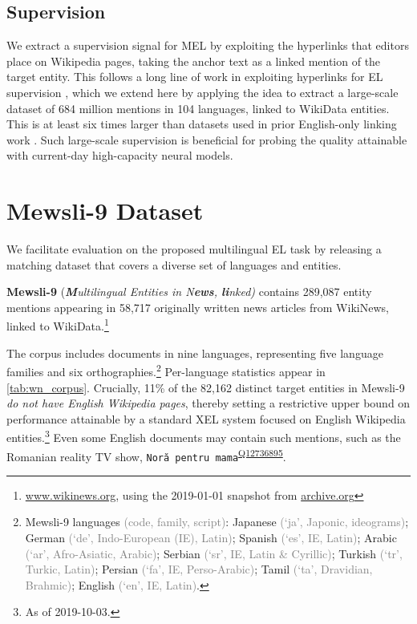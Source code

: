 \documentclass[11pt,a4paper]{article}
\newcommand{\entity}[1]{\texttt{#1}}
\newcommand{\ientity}[2]{\entity{#1}\textsuperscript{\href{https://www.wikidata.org/wiki/#2}{#2}}}
\begin{document}
\subsection{Supervision}
We extract a supervision signal for MEL by exploiting the hyperlinks that editors place on Wikipedia pages, taking the anchor text as a linked mention of the target entity.
This follows a long line of work in exploiting hyperlinks for EL supervision \cite{bunescu-pasca-2006-using,singh12:wiki-links,logan-etal-2019-baracks},
which we extend here by applying the idea to extract a large-scale dataset of 684 million mentions in 104 languages, linked to WikiData entities.
This is at least six times larger than datasets used in prior English-only linking work \citep{gillick-etal-2019-learning}.
Such large-scale supervision is beneficial for probing the quality attainable with current-day high-capacity neural models.

\section{Mewsli-9 Dataset}
We facilitate evaluation on the proposed multilingual EL task by releasing a matching dataset that covers a diverse set of languages and entities.

\textbf{Mewsli-9} (\emph{\textbf{M}ultilingual Entities in N\textbf{ews}, \textbf{li}nked)} contains 289,087 entity mentions appearing in 58,717 originally written news articles from WikiNews,
linked to WikiData.\footnote{\url{www.wikinews.org}, using the 2019-01-01 snapshot from \url{archive.org}}

The corpus includes documents in nine languages, representing five language families and six orthographies.\footnote{Mewsli-9 languages \textcolor{gray}{(code, family, script)}:
Japanese \textcolor{gray}{(`ja', Japonic, ideograms)};
German   \textcolor{gray}{(`de', Indo-European (IE), Latin)};
Spanish  \textcolor{gray}{(`es', IE, Latin)};
Arabic   \textcolor{gray}{(`ar', Afro-Asiatic,} \textcolor{gray}{Arabic)};
Serbian  \textcolor{gray}{(`sr', IE, Latin \& Cyrillic)};
Turkish  \textcolor{gray}{(`tr', Turkic, Latin)};
Persian  \textcolor{gray}{(`fa', IE, Perso-Arabic)};
Tamil    \textcolor{gray}{(`ta', Dravidian, Brahmic)};
English  \textcolor{gray}{(`en', IE, Latin)}.}
Per-language statistics appear in \autoref{tab:wn_corpus}.
Crucially, 11\% of the 82,162 distinct target entities in \mbox{Mewsli-9}
\emph{do not have English Wikipedia pages},
thereby setting a restrictive upper bound on performance attainable by a standard XEL system focused on English Wikipedia entities.\footnote{As of 2019-10-03.}
Even some English documents may contain such mentions, such as the Romanian reality TV show, \ientity{Noră pentru mama}{Q12736895}.
\end{document}
